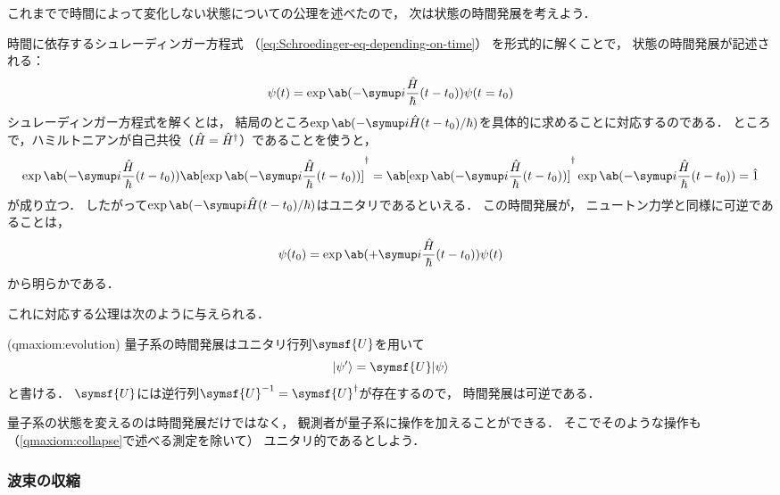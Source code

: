 \documentclass[
]{sotsu}
\begin{document}
これまでで時間によって変化しない状態についての公理を述べたので，
次は状態の時間発展を考えよう．

時間に依存するシュレーディンガー方程式
（\cref{eq:Schroedinger-eq-depending-on-time}）
を形式的に解くことで，
状態の時間発展が記述される：
\begin{equation*}
    \psi(t) = \exp \ab(-\iu \frac{\hat{H}}{\hbar} (t - t_0)) \psi(t = t_0)
\end{equation*}
シュレーディンガー方程式を解くとは，
結局のところ$\exp \ab( -\iu \hat{H} (t - t_0) / \hbar )$を具体的に求めることに対応するのである．
ところで，ハミルトニアンが自己共役（$\hat{H} = {\hat{H}}^\dagger$）であることを使うと，
\begin{equation*}
      \exp \ab(-\iu \frac{\hat{H}}{\hbar} (t - t_0))
      \adjoint{\ab[ \exp \ab(-\iu \frac{\hat{H}}{\hbar} (t - t_0)) ]}
    = \adjoint{\ab[ \exp \ab(-\iu \frac{\hat{H}}{\hbar} (t - t_0)) ]}
      \exp \ab(-\iu \frac{\hat{H}}{\hbar} (t - t_0))
    = \idop
\end{equation*}
が成り立つ．
したがって$\exp \ab( -\iu \hat{H} (t - t_0) / \hbar )$はユニタリであるといえる．
この時間発展が，
ニュートン力学と同様に可逆であることは，
\begin{equation*}
    \psi(t_0) = \exp \ab(+\iu \frac{\hat{H}}{\hbar} (t - t_0)) \psi(t)
\end{equation*}
から明らかである．

これに対応する公理は次のように与えられる．

\begin{qmaxiom}[状態の時間発展](qmaxiom:evolution)
    量子系の時間発展はユニタリ行列$\symsf{U}$を用いて
    \begin{equation}
        \ket{\psi'} = \symsf{U} \ket{\psi}
    \end{equation}
    と書ける．
    $\symsf{U}$には逆行列$\symsf{U}^{-1} = \adjoint{\symsf{U}}$が存在するので，
    時間発展は可逆である．
\end{qmaxiom}

量子系の状態を変えるのは時間発展だけではなく，
観測者が量子系に操作を加えることができる．
そこでそのような操作も
（\cref{qmaxiom:collapse}で述べる測定を除いて）
ユニタリ的であるとしよう．





\subsubsection{波束の収縮}
\end{document}
